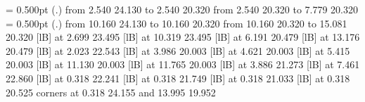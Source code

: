 \documentclass[10pt]{article}
\begin{document}
{%
%
\linethickness= 0.500pt
\setplotsymbol ({\thinlinefont .})
\putrule from  2.540 24.130 to  2.540 20.320
\putrule from  2.540 20.320 to  7.779 20.320
%
%
\linethickness= 0.500pt
\setplotsymbol ({\thinlinefont .})
\putrule from 10.160 24.130 to 10.160 20.320
\putrule from 10.160 20.320 to 15.081 20.320
%
%
 [lB] at  2.699 23.495
%
%
 [lB] at 10.319 23.495
%
%
 [lB] at  6.191 20.479
%
%
 [lB] at 13.176 20.479
%
%
 [lB] at  2.023 22.543
%
%
 [lB] at  3.986 20.003
%
%
 [lB] at  4.621 20.003
%
%
 [lB] at  5.415 20.003
%
%
 [lB] at 11.130 20.003
%
%
 [lB] at 11.765 20.003
%
%
 [lB] at  3.886 21.273
%
%
 [lB] at  7.461 22.860
%
%
 [lB] at  0.318 22.241
%
%
 [lB] at  0.318 21.749
%
%
 [lB] at  0.318 21.033
%
%
 [lB] at  0.318 20.525
\linethickness=0pt
\putrectangle corners at  0.318 24.155 and 13.995 19.952
\endpicture}
\end{document}
